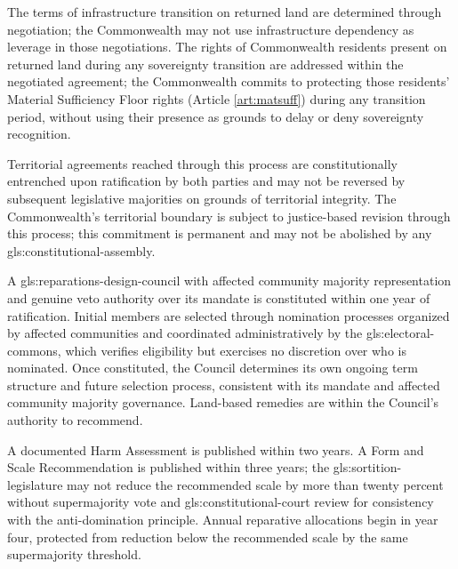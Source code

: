 The terms of infrastructure transition on returned land are determined through negotiation; the Commonwealth may not use infrastructure dependency as leverage in those negotiations. The rights of Commonwealth residents present on returned land during any sovereignty transition are addressed within the negotiated agreement; the Commonwealth commits to protecting those residents' Material Sufficiency Floor rights (Article \ref{art:matsuff}) during any transition period, without using their presence as grounds to delay or deny sovereignty recognition.

Territorial agreements reached through this process are constitutionally entrenched upon ratification by both parties and may not be reversed by subsequent legislative majorities on grounds of territorial integrity. The Commonwealth's territorial boundary is subject to justice-based revision through this process; this commitment is permanent and may not be abolished by any \gls{gls:constitutional-assembly}.


A \gls{gls:reparations-design-council} with affected community majority representation and genuine veto authority over its mandate is constituted within one year of ratification. Initial members are selected through nomination processes organized by affected communities and coordinated administratively by the \gls{gls:electoral-commons}, which verifies eligibility but exercises no discretion over who is nominated. Once constituted, the Council determines its own ongoing term structure and future selection process, consistent with its mandate and affected community majority governance. Land-based remedies are within the Council's authority to recommend.

A documented Harm Assessment is published within two years. A Form and Scale Recommendation is published within three years; the \gls{gls:sortition-legislature} may not reduce the recommended scale by more than twenty percent without supermajority vote and \gls{gls:constitutional-court} review for consistency with the anti-domination principle. Annual reparative allocations begin in year four, protected from reduction below the recommended scale by the same supermajority threshold.

